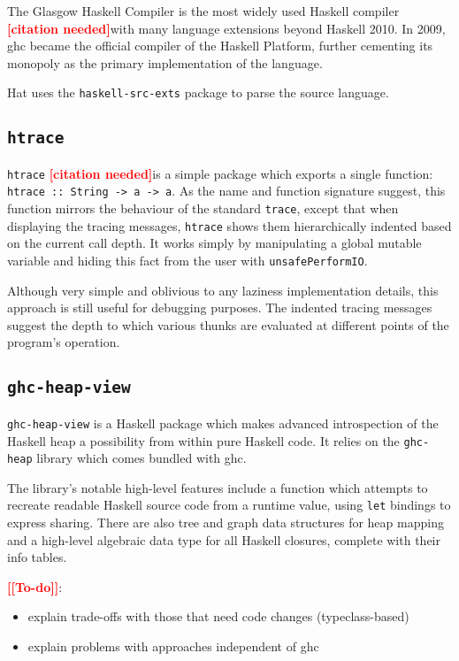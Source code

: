 \documentclass[thesis=B,english]{FITthesis}[2019/12/23]
\newcommand{\todo}[1]{\textcolor{red}{\textbf{[[#1]]}}}
\newcommand{\citationNeeded}{\textcolor{red}{\textbf{[citation needed]}}}
\newcommand{\hackage}[1]{\texttt{#1}}
\newcommand{\hsSignature}[1]{\texttt{#1}}
\newcommand{\hsIdent}[1]{\texttt{#1}}
\newcommand{\hsCode}[1]{\texttt{#1}}
\begin{document}
The Glasgow Haskell Compiler is the most widely used Haskell compiler
\citationNeeded with many language extensions beyond Haskell 2010. In 2009,
\acrshort{ghc} became the official compiler of the Haskell
Platform\cite{haskell-platform}, further cementing its monopoly as the primary
implementation of the language.

Hat uses the \hackage{haskell-src-exts} package to parse the source language.


\subsection*{\hackage{htrace}} \label{sec:htrace}
\hackage{htrace} \citationNeeded is a simple package which exports a single
function: \hsSignature{htrace :: String -> a -> a}. As the name and function
signature suggest, this function mirrors the behaviour of the standard
\hsIdent{trace}, except that when displaying the tracing messages,
\hackage{htrace} shows them hierarchically indented based on the current call
depth. It works simply by manipulating a global mutable variable and hiding
this fact from the user with \hsIdent{unsafePerformIO}.

Although very simple and oblivious to any laziness implementation details, this
approach is still useful for debugging purposes. The indented tracing messages
suggest the depth to which various thunks are evaluated at different points of
the program's operation.

\subsection*{\hackage{ghc-heap-view}} \label{sec:ghc-heap-view}
\hackage{ghc-heap-view} is a Haskell package which makes advanced introspection
of the Haskell heap a possibility from within pure Haskell code. It relies on
the \hackage{ghc-heap} library which comes bundled with \acrshort{ghc}.

The library's notable high-level features include a function which attempts to
recreate readable Haskell source code from a runtime value, using \hsCode{let}
bindings to express sharing. There are also tree and graph data structures for
heap mapping and a high-level algebraic data type for all Haskell closures,
complete with their info tables.

\todo{To-do}:
\begin{itemize}
	\item explain trade-offs with those that need code changes (typeclass-based)
	\item explain problems with approaches independent of \acrshort{ghc}
\end{itemize}
\end{document}
